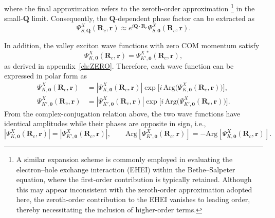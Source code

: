 where the final approximation refers to the zeroth-order approximation \footnote{A similar expansion scheme is commonly employed in evaluating the electron--hole exchange interaction (EHEI) within the Bethe--Salpeter equation, where the first-order contribution is typically retained. Although this may appear inconsistent with the zeroth-order approximation adopted here, the zeroth-order contribution to the EHEI vanishes to leading order, thereby necessitating the inclusion of higher-order terms.} in the small-$\boldsymbol{Q}$ limit. Consequently, the $\boldsymbol{Q}$-dependent phase factor can be extracted as~\cite{qiu2015nonanalyticity}
\begin{equation}
\Psi^{X}_{S,\boldsymbol{Q}}(\boldsymbol{R}_c,\boldsymbol{r})
\approx
e^{i\boldsymbol{Q}\cdot\boldsymbol{R}_c}
\Psi^{X}_{S,\boldsymbol{0}}(\boldsymbol{R}_c,\boldsymbol{r}).
\label{relation}
\end{equation}

In addition, the valley exciton wave functions with zero COM momentum satisfy
\begin{equation}
\Psi^{X}_{K,\boldsymbol{0}}(\boldsymbol{R}_c,\boldsymbol{r})
=
\Psi^{X\,*}_{K',\boldsymbol{0}}(\boldsymbol{R}_c,\boldsymbol{r}),
\end{equation}
as derived in appendix~\ref{ch:ZERO}. Therefore, each wave function can be expressed in polar form as
\begin{equation}
\begin{aligned}
\Psi^{X}_{K,\boldsymbol{0}}(\boldsymbol{R}_c,\boldsymbol{r})
&=
\left|\Psi^{X}_{K,\boldsymbol{0}}(\boldsymbol{R}_c,\boldsymbol{r})\right|
\exp\!\Big[i\,\mathrm{Arg}\big(\Psi^{X}_{K,\boldsymbol{0}}(\boldsymbol{R}_c,\boldsymbol{r})\big)\Big],
\\
\Psi^{X}_{K',\boldsymbol{0}}(\boldsymbol{R}_c,\boldsymbol{r})
&=
\left|\Psi^{X}_{K',\boldsymbol{0}}(\boldsymbol{R}_c,\boldsymbol{r})\right|
\exp\!\Big[i\,\mathrm{Arg}\big(\Psi^{X}_{K',\boldsymbol{0}}(\boldsymbol{R}_c,\boldsymbol{r})\big)\Big].
\end{aligned}
\end{equation}
From the complex-conjugation relation above, the two wave functions have identical amplitudes while their phases are opposite in sign, i.e.,
\begin{equation}
\left|\Psi^{X}_{K,\boldsymbol{0}}(\boldsymbol{R}_c,\boldsymbol{r})\right|
=
\left|\Psi^{X}_{K',\boldsymbol{0}}(\boldsymbol{R}_c,\boldsymbol{r})\right|,
\qquad
\mathrm{Arg}\!\left[\Psi^{X}_{K',\boldsymbol{0}}(\boldsymbol{R}_c,\boldsymbol{r})\right]
=
-\mathrm{Arg}\!\left[\Psi^{X}_{K,\boldsymbol{0}}(\boldsymbol{R}_c,\boldsymbol{r})\right].
\label{conjugation_relation}
\end{equation}
%
%
%
%
%
%
